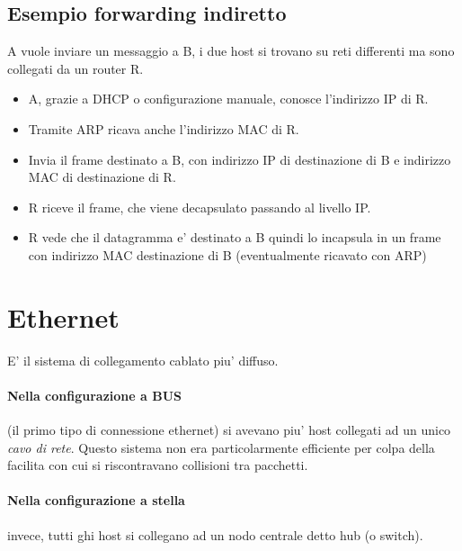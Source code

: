 \subsection{Esempio forwarding indiretto}
A vuole inviare un messaggio a B, i due host si trovano su reti differenti ma sono collegati da un router R.
\begin{itemize}
    \item A, grazie a DHCP o configurazione manuale, conosce l'indirizzo IP di R.
    \item Tramite ARP ricava anche l'indirizzo MAC di R.
    \item Invia il frame destinato a B, con indirizzo IP di destinazione di B e indirizzo MAC di destinazione di R.
    \item R riceve il frame, che viene decapsulato passando al livello IP.
    \item R vede che il datagramma e' destinato a B quindi lo incapsula in un frame con indirizzo MAC destinazione di B (eventualmente ricavato con ARP)
\end{itemize}
\section{Ethernet}
E' il sistema di collegamento cablato piu' diffuso.
\paragraph{Nella configurazione a BUS} (il primo tipo di connessione ethernet) si avevano piu' host collegati ad un unico \textit{cavo di rete}. Questo sistema non era particolarmente efficiente per colpa della facilita con cui si riscontravano collisioni tra pacchetti.
\paragraph{Nella configurazione a stella} invece, tutti ghi host si collegano ad un nodo centrale detto hub (o switch).
